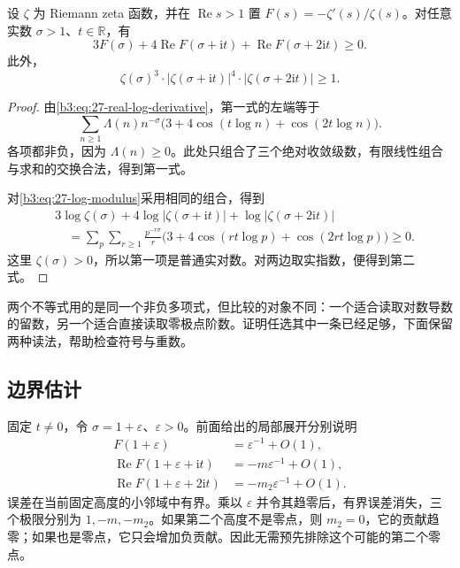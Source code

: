 \begin{lemma}[三个高度的正性]\label{b3:lem:27-three-height-positivity}
设 \(\zeta\) 为 Riemann zeta 函数，并在 \(\operatorname{Re}s>1\) 置 \(F(s)=-\zeta'(s)/\zeta(s)\)。对任意实数 \(\sigma>1\)、\(t\in\mathbb R\)，有
\begin{equation}\label{b3:eq:27-positivity}
 3F(\sigma)+4\operatorname{Re}F(\sigma+\mathrm it)
       +\operatorname{Re}F(\sigma+2\mathrm it)\ge0.
\end{equation}
此外，
\begin{equation}\label{b3:eq:27-zeta-product-inequality}
 \zeta(\sigma)^3\cdot|\zeta(\sigma+\mathrm it)|^4
                  \cdot|\zeta(\sigma+2\mathrm it)|\ge1.
\end{equation}
\end{lemma}
\begin{proof}
由\eqref{b3:eq:27-real-log-derivative}，第一式的左端等于
\[
 \sum_{n\ge1}\Lambda(n)n^{-\sigma}
       \bigl(3+4\cos(t\log n)+\cos(2t\log n)\bigr).
\]
各项都非负，因为 \(\Lambda(n)\ge0\)。此处只组合了三个绝对收敛级数，有限线性组合与求和的交换合法，得到第一式。

对\eqref{b3:eq:27-log-modulus}采用相同的组合，得到
\[
 \begin{aligned}
 &3\log\zeta(\sigma)+4\log|\zeta(\sigma+\mathrm it)|
                         +\log|\zeta(\sigma+2\mathrm it)|\\
 &\quad=\sum_p\sum_{r\ge1}\frac{p^{-r\sigma}}r
       \bigl(3+4\cos(rt\log p)+\cos(2rt\log p)\bigr)\ge0.
 \end{aligned}
\]
这里 \(\zeta(\sigma)>0\)，所以第一项是普通实对数。对两边取实指数，便得到第二式。
\end{proof}

两个不等式用的是同一个非负多项式，但比较的对象不同：一个适合读取对数导数的留数，另一个适合直接读取零极点阶数。证明任选其中一条已经足够，下面保留两种读法，帮助检查符号与重数。

\subsection{边界估计}
\label{b3:subsec:270303}

固定 \(t\ne0\)，令 \(\sigma=1+\varepsilon\)、\(\varepsilon>0\)。前面给出的局部展开分别说明
\[
 \begin{aligned}
 F(1+\varepsilon)&=\varepsilon^{-1}+O(1),\\
 \operatorname{Re}F(1+\varepsilon+\mathrm it)
       &=-m\varepsilon^{-1}+O(1),\\
 \operatorname{Re}F(1+\varepsilon+2\mathrm it)
       &=-m_2\varepsilon^{-1}+O(1).
 \end{aligned}
\]
误差在当前固定高度的小邻域中有界。乘以 \(\varepsilon\) 并令其趋零后，有界误差消失，三个极限分别为 \(1,-m,-m_2\)。如果第二个高度不是零点，则 \(m_2=0\)，它的贡献趋零；如果也是零点，它只会增加负贡献。因此无需预先排除这个可能的第二个零点。

